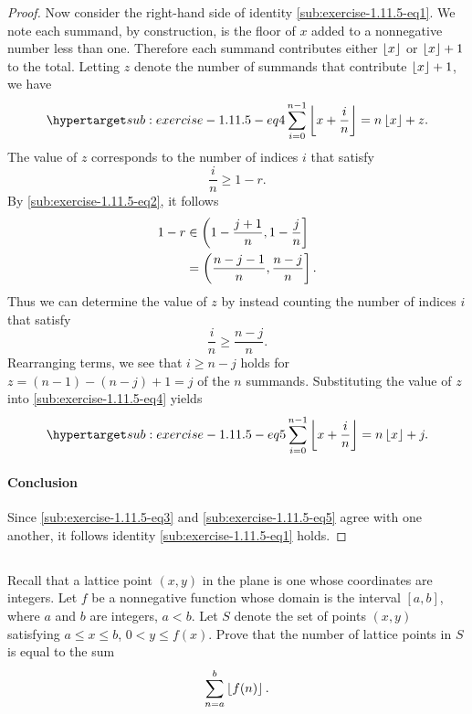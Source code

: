 \documentclass{report}
\begin{document}
\begin{proof}
      Now consider the right-hand side of identity
        \eqref{sub:exercise-1.11.5-eq1}.
      We note each summand, by construction, is the floor of $x$ added to a
        nonnegative number less than one.
      Therefore each summand contributes either $\left\lfloor x\right\rfloor$ or $\left\lfloor x\right\rfloor + 1$
        to the total.
      Letting $z$ denote the number of summands that contribute $\left\lfloor x\right\rfloor + 1$,
        we have
        \begin{equation}
          \hyperlabel{sub:exercise-1.11.5-eq4}
          \sum_{i=0}^{n-1} \floor{x + \frac{i}{n}} = n\floor{x} + z.
        \end{equation}
      The value of $z$ corresponds to the number of indices $i$ that satisfy
        $$\frac{i}{n} \geq 1 - r.$$
      By \eqref{sub:exercise-1.11.5-eq2}, it follows
        \begin{align*}
          1 - r
            & \in \left(1 - \frac{j+1}{n}, 1-\frac{j}{n}\right] \\
            & = \left(\frac{n - j - 1}{n}, \frac{n - j}{n}\right].
        \end{align*}
      Thus we can determine the value of $z$ by instead counting the number of
        indices $i$ that satisfy $$\frac{i}{n} \geq \frac{n - j}{n}.$$
      Rearranging terms, we see that $i \geq n - j$ holds for
        $z = (n - 1) - (n - j) + 1 = j$ of the $n$ summands.
      Substituting the value of $z$ into \eqref{sub:exercise-1.11.5-eq4} yields
        \begin{equation}
          \hyperlabel{sub:exercise-1.11.5-eq5}
          \sum_{i=0}^{n-1} \floor{x + \frac{i}{n}} = n\floor{x} + j.
        \end{equation}

    \paragraph{Conclusion}%

      Since \eqref{sub:exercise-1.11.5-eq3} and \eqref{sub:exercise-1.11.5-eq5}
        agree with one another, it follows identity
        \eqref{sub:exercise-1.11.5-eq1} holds.

  \end{proof}

\subsection{}%

  Recall that a lattice point $(x, y)$ in the plane is one whose coordinates are
    integers.
  Let $f$ be a nonnegative function whose domain is the interval $[a, b]$, where
    $a$ and $b$ are integers, $a < b$.
  Let $S$ denote the set of points $(x, y)$ satisfying $a \leq x \leq b$,
    $0 < y \leq f(x)$.
  Prove that the number of lattice points in $S$ is equal to the sum
    $$\sum_{n=a}^b \left\lfloor f(n)\right\rfloor.$$
\end{document}
